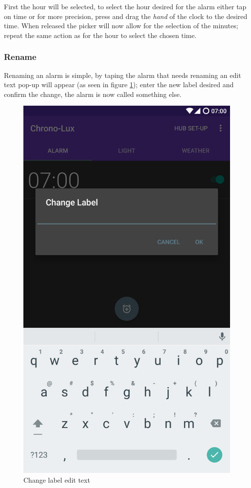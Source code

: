 First the hour will be selected, to select the hour desired for the
alarm either tap on time or for more precision, press and drag the
\emph{hand} of the clock to the desired time. When released the picker
will now allow for the selection of the minutes; repeat the same action
as for the hour to select the chosen time.

\subsubsection{Rename}\label{rename}

Renaming an alarm is simple, by taping the alarm that needs renaming an
edit text pop-up will appear (as seen in figure \ref{fig:changeLabel});
enter the new label desired and confirm the change, the alarm is now
called something else.

\begin{figure}[H]
  \centering
  \includegraphics[scale=0.1]{Images/changeLabel.png}
  \caption{Change label edit text}
  \label{fig:changeLabel}
\end{figure}

